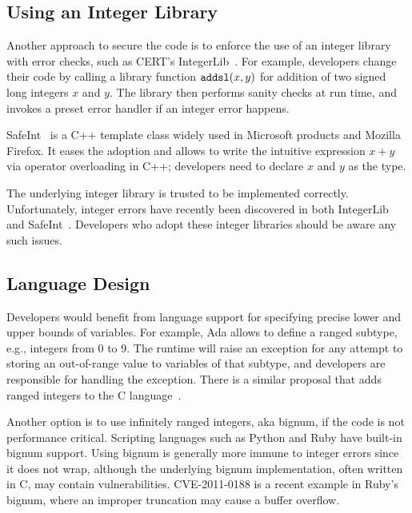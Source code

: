 \subsection{Using an Integer Library}

Another approach to secure the code is to enforce the use of an integer
library with error checks, such as CERT's
IntegerLib~\cite[INT03-C]{seacord:secure-c}.  For example, developers
change their code by calling a library function $\texttt{addsl}(x, y)$
for addition of two signed long integers $x$ and $y$.  The library
then performs sanity checks at run time, and invokes a preset error
handler if an integer error happens.

SafeInt~\cite{safeint} is a C++ template class widely used in Microsoft
products and Mozilla Firefox.  It eases the adoption and allows to write
the intuitive expression $x + y$ via operator overloading in C++;
developers need to declare $x$ and $y$ as the 
type.

The underlying integer library is trusted to be implemented correctly.
Unfortunately, integer errors have recently been discovered in both
IntegerLib and SafeInt~\cite{ioc}.  Developers who adopt these
integer libraries should be aware any such issues.
%
%
%


\subsection{Language Design}

Developers would benefit from language support for specifying precise
lower and upper bounds of variables.  For example, Ada allows to
define a ranged subtype, e.g., integers from 0 to 9.  The runtime
will raise an exception for any attempt to storing an out-of-range
value to variables of that subtype, and developers are responsible
for handling the exception.  There is a similar proposal that adds
ranged integers to the C language~\cite{ranged-c}.

Another option is to use infinitely ranged integers, aka bignum,
if the code is not performance critical.  Scripting languages such
as Python and Ruby have built-in bignum support.  Using bignum is
generally more immune to integer errors since it does not wrap,
although the underlying bignum implementation, often written in C,
may contain vulnerabilities.  CVE-2011-0188 is a recent example in
Ruby's bignum, where an improper truncation may cause a buffer
overflow.
%


